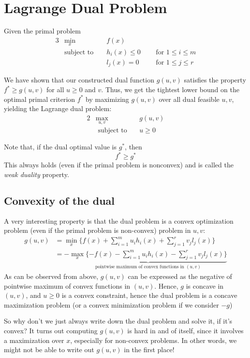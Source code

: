 \documentclass[twoside]{article}
\begin{document}
\section{Lagrange Dual Problem}
\label{sec:lagr-dual-probl}
Given the primal problem
\begin{alignat*}{3}
&\min_x &&f(x) \\
&\text{subject to } && h_i(x) \leq 0 ~~~&&\text{for } 1 \leq i \leq m \\
&&& l_j(x) = 0 ~~~&&\text{for } 1 \leq j \leq r
\end{alignat*}

We have shown that our constructed dual function $g(u,v)$ satisfies the property $f^* \geq g(u,v)$ for all $u \geq 0$ and $v$. Thus, we get the tightest lower bound on the optimal primal criterion $f^*$ by maximizing $g(u,v)$ over all dual feasible $u,v$, yielding the Lagrange dual problem:
\begin{alignat*}{2}
&\max_{u,v} &&g(u,v) \\
&\text{ subject to}&~&u \geq 0 
\end{alignat*}

Note that, if the dual optimal value is $g^*$, then
$$ f^* \geq g^* $$
This always holds (even if the primal problem is nonconvex) and is called the \textit{weak duality} property. 

\subsection{Convexity of the dual}

A very interesting property is that the dual problem is a convex optimization problem (even if the primal problem is non-convex) problem in $u, v$:
\begin{align*}
g(u, v) &= \min_x \{f(x) + \sum_{i=1}^m u_i h_i(x) + \sum_{j=1}^r v_j l_j(x) \} \\
        &= - \underbrace{\max_x \{-f(x) - \sum_{i=1}^m u_i h_i(x) - \sum_{j=1}^r v_j l_j(x) \}}_{\text{pointwise maximum of convex functions in } (u, v)}
\end{align*}
As can be observed from above, $g(u,v)$ can be expressed as the negative of pointwise maximum of convex functions in $(u,v)$. Hence, $g$ is concave in $(u,v)$, and $u \geq 0$ is a convex constraint, hence the dual problem is a concave maximization problem (or a convex minimization problem if we consider $-g$)


So why don't we just always write down the dual problem and solve it, if it's
convex? It turns out computing $g(u, v)$ is hard in and of itself, since it
involves a maximization over $x$, especially for non-convex problems. In other
words, we might not be able to write out $g(u, v)$ in the first place!
\end{document}
